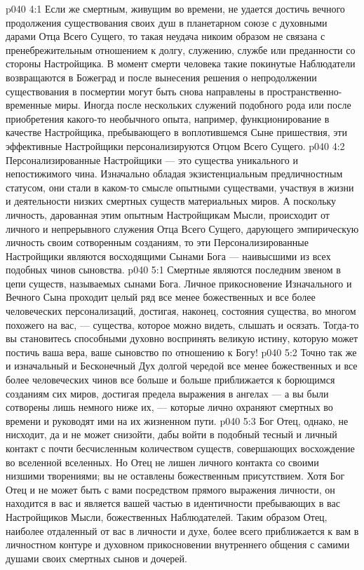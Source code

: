 \vs p040 4:1 Если же смертным, живущим во времени, не удается достичь вечного продолжения существования своих душ в планетарном союзе с духовными дарами Отца Всего Сущего, то такая неудача никоим образом не связана с пренебрежительным отношением к долгу, служению, службе или преданности со стороны Настройщика. В момент смерти человека такие покинутые Наблюдатели возвращаются в Божеград и после вынесения решения о непродолжении существования в посмертии могут быть снова направлены в пространственно\hyp{}временные миры. Иногда после нескольких служений подобного рода или после приобретения какого\hyp{}то необычного опыта, например, функционирование в качестве Настройщика, пребывающего в воплотившемся Сыне пришествия, эти эффективные Настройщики персонализируются Отцом Всего Сущего.
\vs p040 4:2 Персонализированные Настройщики --- это существа уникального и непостижимого чина. Изначально обладая экзистенциальным предличностным статусом, они стали в каком\hyp{}то смысле опытными существами, участвуя в жизни и деятельности низких смертных существ материальных миров. А поскольку личность, дарованная этим опытным Настройщикам Мысли, происходит от личного и непрерывного служения Отца Всего Сущего, дарующего эмпирическую личность своим сотворенным созданиям, то эти Персонализированные Настройщики являются восходящими Сынами Бога --- наивысшими из всех подобных чинов сыновства.
\vs p040 5:1 Смертные являются последним звеном в цепи существ, называемых сынами Бога. Личное прикосновение Изначального и Вечного Сына проходит целый ряд все менее божественных и все более человеческих персонализаций, достигая, наконец, состояния существа, во многом похожего на вас, --- существа, которое можно видеть, слышать и осязать. Тогда\hyp{}то вы становитесь способными духовно воспринять великую истину, которую может постичь ваша вера, ваше сыновство по отношению к Богу!
\vs p040 5:2 Точно так же и изначальный и Бесконечный Дух долгой чередой все менее божественных и все более человеческих чинов все больше и больше приближается к борющимся созданиям сих миров, достигая предела выражения в ангелах --- а вы были сотворены лишь немного ниже их, --- которые лично охраняют смертных во времени и руководят ими на их жизненном пути.
\vs p040 5:3 Бог Отец, однако, не нисходит, да и не может снизойти, дабы войти в подобный тесный и личный контакт с почти бесчисленным количеством существ, совершающих восхождение во вселенной вселенных. Но Отец не лишен личного контакта со своими низшими творениями; вы не оставлены божественным присутствием. Хотя Бог Отец и не может быть с вами посредством прямого выражения личности, он находится в вас и является вашей частью в идентичности пребывающих в вас Настройщиков Мысли, божественных Наблюдателей. Таким образом Отец, наиболее отдаленный от вас в личности и духе, более всего приближается к вам в личностном контуре и духовном прикосновении внутреннего общения с самими душами своих смертных сынов и дочерей.
